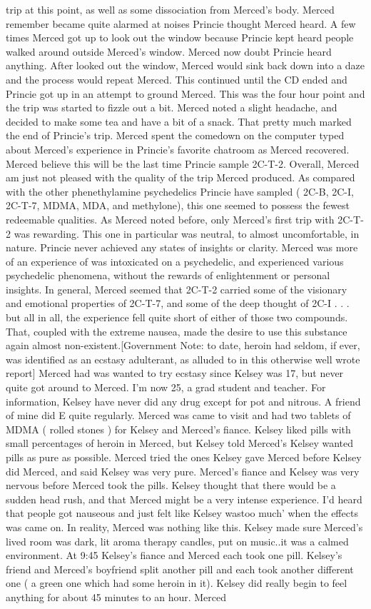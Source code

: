 \documentclass[12pt]{book}
\begin{document}
trip at this point, as well as some dissociation from Merced's body. Merced remember became quite alarmed at noises Princie thought Merced heard. A few times Merced got up to look out the window because Princie kept heard people walked around outside Merced's window. Merced now doubt Princie heard anything. After looked out the window, Merced would sink back down into a daze and the process would repeat Merced. This continued until the CD ended and Princie got up in an attempt to ground Merced. This was the four hour point and the trip was started to fizzle out a bit. Merced noted a slight headache, and decided to make some tea and have a bit of a snack. That pretty much marked the end of Princie's trip. Merced spent the comedown on the computer typed about Merced's experience in Princie's favorite chatroom as Merced recovered. Merced believe this will be the last time Princie sample 2C-T-2. Overall, Merced am just not pleased with the quality of the trip Merced produced. As compared with the other phenethylamine psychedelics Princie have sampled ( 2C-B, 2C-I, 2C-T-7, MDMA, MDA, and methylone), this one seemed to possess the fewest redeemable qualities. As Merced noted before, only Merced's first trip with 2C-T-2 was rewarding. This one in particular was neutral, to almost uncomfortable, in nature. Princie never achieved any states of insights or clarity. Merced was more of an experience of was intoxicated on a psychedelic, and experienced various psychedelic phenomena, without the rewards of enlightenment or personal insights. In general, Merced seemed that 2C-T-2 carried some of the visionary and emotional properties of 2C-T-7, and some of the deep thought of 2C-I . . . but all in all, the experience fell quite short of either of those two compounds. That, coupled with the extreme nausea, made the desire to use this substance again almost non-existent.[Government Note: to date, heroin had seldom, if ever, was identified as an ecstasy adulterant, as alluded to in this otherwise well wrote report] Merced had was wanted to try ecstasy since Kelsey was 17, but never quite got around to Merced. I'm now 25, a grad student and teacher. For information, Kelsey have never did any drug except for pot and nitrous. A friend of mine did E quite regularly. Merced was came to visit and had two tablets of MDMA ( rolled stones ) for Kelsey and Merced's fiance. Kelsey liked pills with small percentages of heroin in Merced, but Kelsey told Merced's Kelsey wanted pills as pure as possible. Merced tried the ones Kelsey gave Merced before Kelsey did Merced, and said Kelsey was very pure. Merced's fiance and Kelsey was very nervous before Merced took the pills. Kelsey thought that there would be a sudden head rush, and that Merced might be a very intense experience. I'd heard that people got nauseous and just felt like Kelsey wastoo much' when the effects was came on. In reality, Merced was nothing like this. Kelsey made sure Merced's lived room was dark, lit aroma therapy candles, put on music..it was a calmed environment. At 9:45 Kelsey's fiance and Merced each took one pill. Kelsey's friend and Merced's boyfriend split another pill and each took another different one ( a green one which had some heroin in it). Kelsey did really begin to feel anything for about 45 minutes to an hour. Merced 
\end{document}
